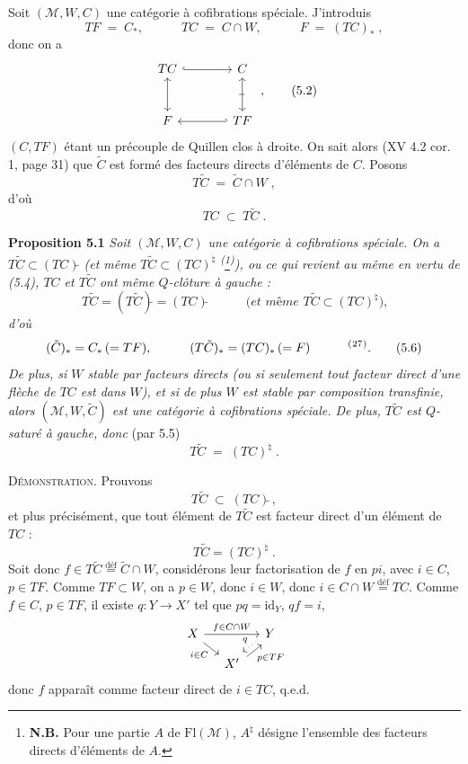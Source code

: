 \documentclass[11pt]{article}
\newcommand{\printedpage}[1]{\marginpar{\footnotesize p.~#1}}
\newcommand{\msp}[1]{\marginpar{\footnotesize [#1]}}
\newcommand{\defeq}{\overset{\text{déf}}{=}}
\newcommand{\fnm}[1]{\textsuperscript{(}\footnotemark[#1]\textsuperscript{)}}
\begin{document}
Soit $(\mathcal{M}, W, C)$ une catégorie à cofibrations spéciale. J'introduis
\[
TF \;=\; C_{*}, \qquad\quad TC \;=\; C \cap W, \qquad\quad F \;=\; (TC)_{*} \; ,
\tag*{(5.1)}
\]
donc on a
\[
\begin{tikzcd}[row sep=large, column sep=large]
TC \arrow[r, hook] \arrow[d, leftrightarrow] & C \arrow[d, leftrightarrow, "\shortmid"{marking, sloped}] \\
F & TF \arrow[l, hook']
\end{tikzcd} \; ,
\tag*{(5.2)}
\]
$(C, TF)$ étant un précouple de Quillen clos à droite. On sait alors (XV 4.2 cor. 1, page 31) que $\tilde{C}$ est formé des facteurs directs d'éléments de $C$. Posons
\[
T\tilde{C} \;=\; \tilde{C} \cap W \; ,
\tag*{(5.3)}
\]
d'où
\[
TC \;\subset\; T\tilde{C} \; .
\tag*{(5.4)}
\]

\textbf{Proposition 5.1} \textit{Soit $(\mathcal{M}, W, C)$ une catégorie à cofibrations spéciale. On a $T\tilde{C} \subset (TC)\tilde{}$ (et même $T\tilde{C} \subset (TC)^{\natural}$ \textsuperscript{(}\footnote[26]{\textbf{N.B.} Pour une partie $A$ de $\mathrm{Fl}(\mathcal{M})$, $A^{\natural}$ désigne l'ensemble des facteurs directs d'éléments de $A$.}\textsuperscript{)}), ou ce qui revient au même en vertu de (5.4), $TC$ et $T\tilde{C}$ ont même $Q$-clôture à gauche :}
\[
T\tilde{C} = (T\tilde{C})\tilde{} = (TC)\tilde{} \qquad\quad \textit{(et même } T\tilde{C} \subset (TC)^{\natural}\textit{),}
\tag*{(5.5)}
\]
\printedpage{42}
\textit{d'où}
\[
(\tilde{C})_{*} = C_{*} \, (= TF), \qquad\quad (T\tilde{C})_{*} = (TC)_{*} \, (= F) \qquad\quad \text{\fnm{27}}.
\tag*{(5.6)}
\]
\textit{De plus, si $W$ stable par facteurs directs (ou si seulement tout facteur direct d'une flèche de $TC$ est dans $W$), et si de plus $W$ est stable par composition transfinie, alors $(\mathcal{M}, W, \tilde{C})$ est une catégorie à cofibrations spéciale. De plus, $T\tilde{C}$ est $Q$-saturé à gauche, donc} (par 5.5)
\[
T\tilde{C} \;=\; (TC)^{\natural} \; .
\tag*{(5.7)}
\]

\msp{page 85}

\textsc{Démonstration}. Prouvons
\[
T\tilde{C} \;\subset\; (TC)\tilde{} \, ,
\]
et plus précisément, que tout élément de $T\tilde{C}$ est facteur direct d'un élément de $TC$ :
\[
T\tilde{C} = (TC)^{\natural} \; .
\]
Soit donc $f \in T\tilde{C} \defeq \tilde{C}\cap W$, considérons leur factorisation de $f$ en $pi$, avec $i \in C$, $p \in TF$. Comme $TF \subset W$, on a $p \in W$, donc $i \in W$, donc $i \in C \cap W \defeq TC$. Comme $f \in C$, $p \in TF$, il existe $q : Y \longrightarrow X'$ tel que $pq = \mathrm{id}_Y$, $qf = i$,
\[
\begin{tikzcd}[column sep=small, row sep=small]
X \arrow[rr, "f\in C\cap W"] \arrow[dr, "i\in C"'] & & Y \arrow[dl, dotted, shift right, "q"'] \\
& X' \arrow[ur, shift right, "p\in TF"'] &
\end{tikzcd}
\]
donc $f$ apparaît comme facteur direct de $i \in TC$, q.e.d.
\end{document}
